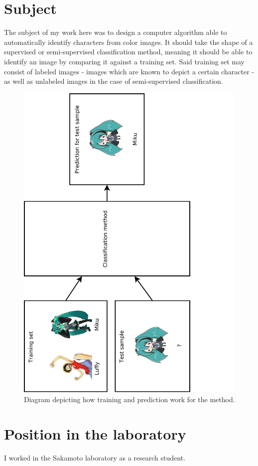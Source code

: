\section{Subject}
The subject of my work here was to design a computer algorithm able to automatically identify characters from color images. It should take the shape of a supervised or semi-supervised classification method, meaning it should be able to identify an image by comparing it against a training set. Said training set may consist of labeled images - images which are known to depict a certain character - as well as unlabeled images in the case of semi-supervised classification.

\begin{figure}[htb!]
\centerline{
\includegraphics[height=1.2\textwidth, angle=270,clip=true,trim=0 0 4cm 0]{images/trainingPredictionDiagram.pdf}
}
\caption{Diagram depicting how training and prediction work for the method.}
\label{fig:trainingPredictionDiagram}
\end{figure}

\section{Position in the laboratory}
I worked in the Sakamoto laboratory as a research student.

